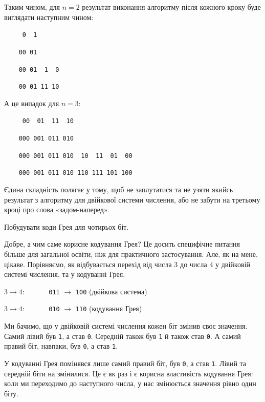 \documentclass{book}
\newcommand{\bitstr}[1]{{\tt #1}}
\begin{document}
Таким чином, для $n=2$ результат виконання алгоритму після кожного кроку буде виглядати наступним чином:
\par\bitstr{~~~~~0~~1}\par
\par\bitstr{~~~~00~01}\par
\par\bitstr{~~~~00~01~~1~~0}\par
\par\bitstr{~~~~00~01~11~10}\par

А це випадок для $n=3$:
\par\bitstr{~~~~~00~~01~~11~~10}\par
\par\bitstr{~~~~000~001~011~010}\par
\par\bitstr{~~~~000~001~011~010~~10~~11~~01~~00}\par
\par\bitstr{~~~~000~001~011~010~110~111~101~100}\par

Єдина складність полягає у тому, щоб не заплутатися та не узяти якийсь результат з алгоритму для двійкової системи числення, або не забути на третьому кроці про слова «задом-наперед».

\begin{exercise}
Побудувати коди Грея для чотирьох біт.
\end{exercise}

Добре, а чим саме корисне кодування Грея?
Це досить специфічне питання більше для загальної освіти, ніж для практичного застосування.
Але, як на мене, цікаве.
Порівняємо, як відбувається перехід від числа $3$ до числа $4$ у двійковій системі числення, та у кодуванні Грея.

\par$3 \to 4$: \bitstr{~~~~~~011} $\to$ \bitstr{100} (двійкова система)
\par$3 \to 4$: \bitstr{~~~~~~010} $\to$ \bitstr{110} (кодування Грея)

Ми бачимо, що у двійковій системі числення кожен біт змінив своє значення.
Самий лівий був \bitstr{1}, а став \bitstr{0}.
Середній також був \bitstr{1} й також став \bitstr{0}.
А самий правий біт, навпаки, був \bitstr{0}, а став \bitstr{1}.

У кодуванні Грея помінявся лише самий правий біт, був \bitstr{0}, а став \bitstr{1}.
Лівий та середній біти на змінилися.
Це є як раз і є корисна властивість кодування Грея: коли ми переходимо до наступного числа, у нас змінюється значення рівно один біту.
\end{document}
